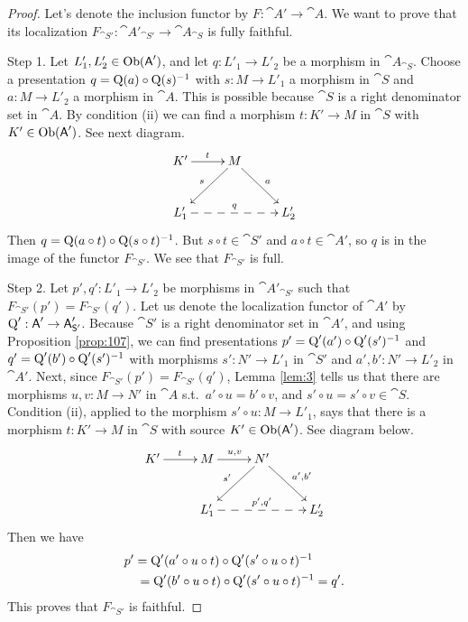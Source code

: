 \begin{proof}
Let's denote the inclusion functor by $F : \cat{A}' \to \cat{A}$. 
We want to prove that its localization 
$F_{\cat{S}'} : \cat{A}'_{\cat{S}'} \to \cat{A}_{\cat{S}}$ 
is fully faithful.

\medskip \noindent
Step 1. Let $L'_1, L'_2 \in \operatorname{Ob}(\operatorname{\mathsf{A}}')$, and let 
$q : L'_1 \to L'_2$ be a
morphism in $\cat{A}_{\cat{S}}$. Choose a presentation 
$q = \operatorname{Q}(a) \circ \operatorname{Q}(s)^{-1}$ with
$s : M \to L'_1$ a morphism in $\cat{S}$
and $a : M \to L'_2$  a morphism in $\cat{A}$. 
This is possible because $\cat{S}$ is a right denominator set in $\cat{A}$. 
By condition (ii) we can find a morphism $t : K' \to M$ in $\cat{S}$ 
with $K' \in \operatorname{Ob}(\operatorname{\mathsf{A}}')$. See next diagram. 
\[ \UseTips  \xymatrix @C=6ex @R=6ex  {
K'
\ar[r]^{t}
& 
M 
\ar[dl]_{s}
\ar[dr]^{a}
\\
L'_1
\ar@{-->}[rr]^{q}
& &
L'_2
} \]
Then  
$q = \operatorname{Q}(a \circ t) \circ \operatorname{Q}(s \circ t)^{-1}$.
But $s \circ t \in \cat{S}'$ and $a \circ t  \in \cat{A}'$, 
so $q$ is in the image of the functor $F_{\cat{S}'}$. We see that 
$F_{\cat{S}'}$ is full. 

\medskip \noindent
Step 2. Let $p', q' : L'_1 \to L'_2$ 
be morphisms in $\cat{A}'_{\cat{S}'}$
such that $F_{\cat{S}'}(p') = F_{\cat{S}'}(q')$.  
Let us denote the localization functor of $\cat{A}'$ by
$\operatorname{Q}' : \operatorname{\mathsf{A}}' \to \operatorname{\mathsf{A}}'_{\operatorname{\mathsf{S}}'}$. 
Because $\cat{S}'$ is a right denominator set in $\cat{A}'$,
and using Proposition \ref{prop:107}, we can find presentations 
$p' = \operatorname{Q}'(a') \circ \operatorname{Q}'(s')^{-1}$
and
$q' = \operatorname{Q}'(b') \circ \operatorname{Q}'(s')^{-1}$
with morphisms 
$s' : N' \to L'_1$ in $\cat{S}'$
and 
$a', b' : N' \to L'_2$ in $\cat{A}'$.
Next, since $F_{\cat{S}'}(p') = F_{\cat{S}'}(q')$, Lemma \ref{lem:3} tells us 
that there are morphisms 
$u, v : M \to N'$ in $\cat{A}$ s.t.\ 
$a' \circ u = b' \circ v$, and 
$s' \circ u = s' \circ v \in \cat{S}$. 
Condition (ii), applied to the morphism 
$s' \circ u : M \to L'_1$, says that there is a morphism 
$t : K' \to M$ in $\cat{S}$ with source $K' \in \operatorname{Ob}(\operatorname{\mathsf{A}}')$.
See diagram below. 
\[ \UseTips  \xymatrix @C=6ex @R=6ex  {
K'
\ar[r]^{t}
&
M 
\ar[r]^{u, v}
&
N'
\ar[dl]_{s'}
\ar[dr]^{a', b'}
\\
&
L'_1
\ar@{-->}[rr]^{p', q'}
& &
L'_2
} \]
Then we have 
\[ \begin{aligned}
&
p' = \operatorname{Q}'(a' \circ u \circ t) \circ \operatorname{Q}'(s' \circ u \circ t)^{-1} 
\\ & \quad 
= \operatorname{Q}'(b' \circ u \circ t) \circ \operatorname{Q}'(s' \circ u \circ t)^{-1} = q' .
\end{aligned} \] 
This proves that $F_{\cat{S}'}$ is faithful.
\end{proof}

